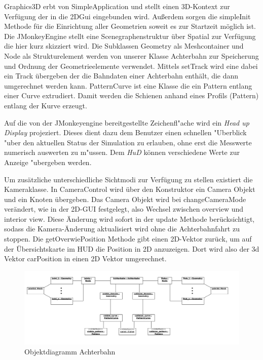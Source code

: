 Graphics3D erbt von SimpleApplication und stellt einen 3D-Kontext zur Verfügung der in die 2DGui eingebunden wird. Außerdem sorgen die simpleInit Methode für die Einrichtung aller Geometrien soweit es zur Startzeit möglich ist.
Die JMonkeyEngine stellt eine Scenegraphenstruktur über Spatial zur Verfügung die hier kurz skizziert wird. Die Subklassen Geometry als Meshcontainer und Node als Strukturelement werden von unserer Klasse Achterbahn 
zur Speicherung und Ordnung der Geometrieelemente verwendet. Mittels setTrack wird eine dabei ein Track übergeben der die Bahndaten einer Achterbahn enthält, die dann umgerechnet werden kann. PatternCurve ist eine Klasse die ein Pattern entlang einer Curve extrudiert. 
Damit werden die Schienen anhand eines Profils (Pattern) entlang der Kurve erzeugt. 

Auf die von der JMonkeyengine bereitgestellte Zeichenfl"ache wird ein \textsl{Head up Display} projeziert. Dieses dient dazu dem Benutzer einen schnellen 
"Uberblick "uber den  aktuellen Status der Simulation zu erlauben, ohne erst die Messwerte numerisch auswerten zu m"ussen. Dem \textsl{HuD} können verschiedene Werte zur
Anzeige "ubergeben werden.

Um zusätzliche unterschiedliche Sichtmodi zur Verfügung zu stellen existiert die Kameraklasse. In CameraControl wird über den Konstruktor ein Camera Objekt und ein Knoten übergeben. Das Camera Objekt wird bei changeCameraMode verändert, wie in der 2D-GUI festgelegt, also Wechsel zwischen overview und interior view. Diese Änderung wird sofort in der update Methode berücksichtigt, sodass die Kamera-Änderung aktualisiert wird ohne die Achterbahnfahrt zu stoppen. Die getOverwiePosition Methode gibt einen 2D-Vektor zurück, um auf der Übersichtskarte im HUD die Position in 2D anzuzeigen. Dort wird also der 3d Vektor carPosition in einen 2D Vektor umgerechnet.


\begin{figure}
\includegraphics[width=\linewidth]{bilder/objektdiagramm_004}
\caption{Objektdiagramm Achterbahn}
\end{figure}

